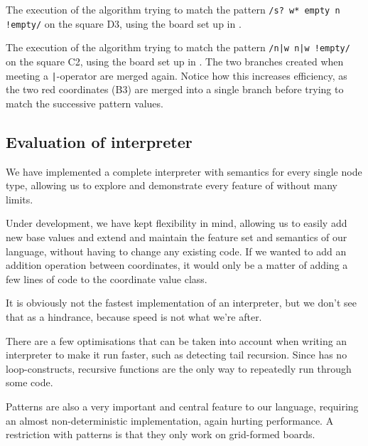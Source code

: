 
The execution of the algorithm trying to match the pattern \texttt{/s? w* empty
n !empty/} on the square D3, using the board set up in
.


The execution of the algorithm trying to match the pattern \texttt{/n|w n|w
!empty/} on the square C2, using the board set up in .
The two branches created when meeting a \texttt{|}-operator are merged again.
Notice how this increases efficiency, as the two red coordinates (B3) are merged
into a single branch before trying to match the successive pattern values.


\subsection{Evaluation of interpreter}
We have implemented a complete interpreter with semantics for every single node
type, allowing us to explore and demonstrate every feature of \productname{}
without many limits.

Under development, we have kept flexibility in mind, allowing us to easily add
new base values and extend and maintain the feature set and semantics of our
language, without having to change any existing code. If we wanted to add an
addition operation between coordinates, it would only be a matter of adding a few lines
of code to the coordinate value class.

It is obviously not the fastest implementation of an interpreter, but we don't
see that as a hindrance, because speed is not what we're after.

There are a few optimisations that can be taken into account when writing an
interpreter to make it run faster, such as detecting tail recursion. Since
\productname{} has no loop-constructs, recursive functions are the only way to
repeatedly run through some code.

Patterns are also a very important and central feature to our language,
requiring an almost non-deterministic implementation, again hurting
performance. A restriction with patterns is that they only work on
grid-formed boards.
